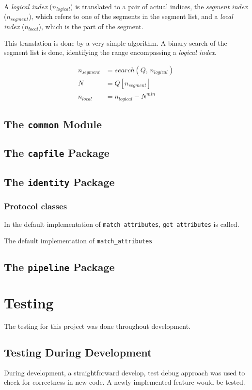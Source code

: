 \documentclass[10pt,a4paper,notitlepage]{report}
\begin{document}
A \emph{logical index} ($n_{logical}$) is translated to a pair of actual indices, the \emph{segment index} ($n_{segment}$), which refers to one of the segments in the segment list, and a \emph{local index} ($n_{local}$), which is the part of the segment.

This translation is done by a very simple algorithm. A binary search of the segment list is done, identifying the range encompassing a \emph{logical index}.

\begin{align*}
n_{segment} &= search(Q,\,n_{logical})\\
N &= Q[n_{segment}]\\
n_{local} &= n_{logical} - N^{min}
\end{align*}

\section{The \texttt{common} Module}
\section{The \texttt{capfile} Package}
\section{The \texttt{identity} Package}
\subsection{Protocol classes}
In the default implementation of \texttt{match_attributes}, \texttt{get_attributes} is called.

The default implementation of \texttt{match_attributes}
\section{The \texttt{pipeline} Package}

\chapter{Testing}
The testing for this project was done throughout development.

\section{Testing During Development}
During development, a straightforward develop, test debug approach was used to check for correctness in new code. A newly implemented feature would be tested.
\end{document}
